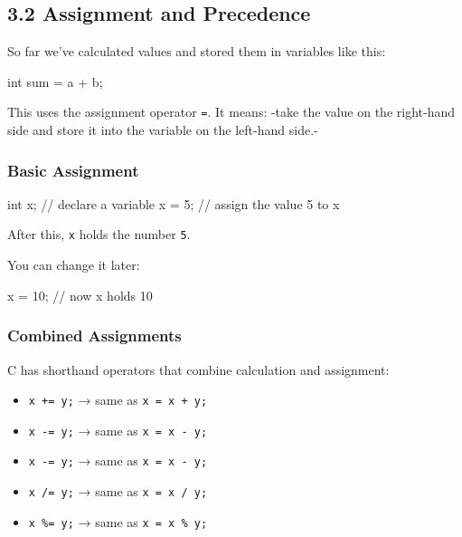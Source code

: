 \documentclass[
  letterpaper,
  DIV=11,
  numbers=noendperiod]{scrreprt}
\newenvironment{Shaded}{\begin{snugshade}}{\end{snugshade}}
\newcommand{\CommentTok}[1]{\textcolor[rgb]{0.37,0.37,0.37}{#1}}
\newcommand{\DataTypeTok}[1]{\textcolor[rgb]{0.68,0.00,0.00}{#1}}
\newcommand{\DecValTok}[1]{\textcolor[rgb]{0.68,0.00,0.00}{#1}}
\newcommand{\NormalTok}[1]{\textcolor[rgb]{0.00,0.23,0.31}{#1}}
\newcommand{\OperatorTok}[1]{\textcolor[rgb]{0.37,0.37,0.37}{#1}}
\providecommand{\tightlist}{%
  \setlength{\itemsep}{0pt}\setlength{\parskip}{0pt}}
\begin{document}
\subsection{3.2 Assignment and
Precedence}\label{assignment-and-precedence}

So far we've calculated values and stored them in variables like this:

\begin{Shaded}
\begin{Highlighting}[]
\DataTypeTok{int}\NormalTok{ sum }\OperatorTok{=}\NormalTok{ a }\OperatorTok{+}\NormalTok{ b}\OperatorTok{;}
\end{Highlighting}
\end{Shaded}

This uses the assignment operator \texttt{=}. It means: -take the value
on the right-hand side and store it into the variable on the left-hand
side.-

\subsubsection{Basic Assignment}\label{basic-assignment}

\begin{Shaded}
\begin{Highlighting}[]
\DataTypeTok{int}\NormalTok{ x}\OperatorTok{;}     \CommentTok{// declare a variable}
\NormalTok{x }\OperatorTok{=} \DecValTok{5}\OperatorTok{;}     \CommentTok{// assign the value 5 to x}
\end{Highlighting}
\end{Shaded}

After this, \texttt{x} holds the number \texttt{5}.

You can change it later:

\begin{Shaded}
\begin{Highlighting}[]
\NormalTok{x }\OperatorTok{=} \DecValTok{10}\OperatorTok{;}    \CommentTok{// now x holds 10}
\end{Highlighting}
\end{Shaded}

\subsubsection{Combined Assignments}\label{combined-assignments}

C has shorthand operators that combine calculation and assignment:

\begin{itemize}
\tightlist
\item
  \texttt{x\ +=\ y;} → same as \texttt{x\ =\ x\ +\ y;}
\item
  \texttt{x\ -=\ y;} → same as \texttt{x\ =\ x\ -\ y;}
\item
  \texttt{x\ -=\ y;} → same as \texttt{x\ =\ x\ -\ y;}
\item
  \texttt{x\ /=\ y;} → same as \texttt{x\ =\ x\ /\ y;}
\item
  \texttt{x\ \%=\ y;} → same as \texttt{x\ =\ x\ \%\ y;}
\end{itemize}
\end{document}
